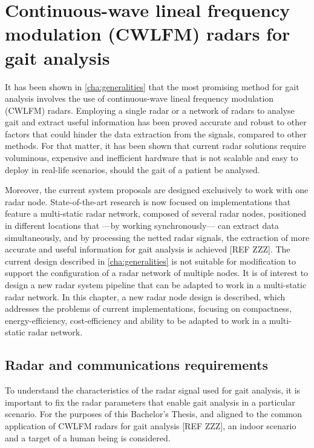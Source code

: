 \chapter{Continuous-wave lineal frequency modulation (CWLFM) radars for gait analysis}

It has been shown in \cref{cha:generalities} that the most promising method for gait analysis involves the use of continuous-wave lineal frequency modulation (CWLFM) radars. Employing a single radar or a network of radars to analyse gait and extract useful information has been proved accurate and robust to other factors that could hinder the data extraction from the signals, compared to other methods. For that matter, it has been shown that current radar solutions require voluminous, expensive and inefficient hardware that is not scalable and easy to deploy in real-life scenarios, should the gait of a patient be analysed.

Moreover, the current system proposals are designed exclusively to work with one radar node. State-of-the-art research is now focused on implementations that feature a multi-static radar network, composed of several radar nodes, positioned in different locations that ---by working synchronously--- can extract data simultaneously, and by processing the netted radar signals, the extraction of more accurate and useful information for gait analysis is achieved [REF ZZZ]. The current design described in \cref{cha:generalities} is not suitable for modification to support the configuration of a radar network of multiple nodes. It is of interest to design a new radar system pipeline that can be adapted to work in a multi-static radar network. In this chapter, a new radar node design is described, which addresses the problems of current implementations, focusing on compactness, energy-efficiency, cost-efficiency and ability to be adapted to work in a multi-static radar network.

\section{Radar and communications requirements}

To understand the characteristics of the radar signal used for gait analysis, it is important to fix the radar parameters that enable gait analysis in a particular scenario. For the purposes of this Bachelor's Thesis, and aligned to the common application of CWLFM radars for gait analysis [REF ZZZ], an indoor scenario and a target of a human being is considered.


